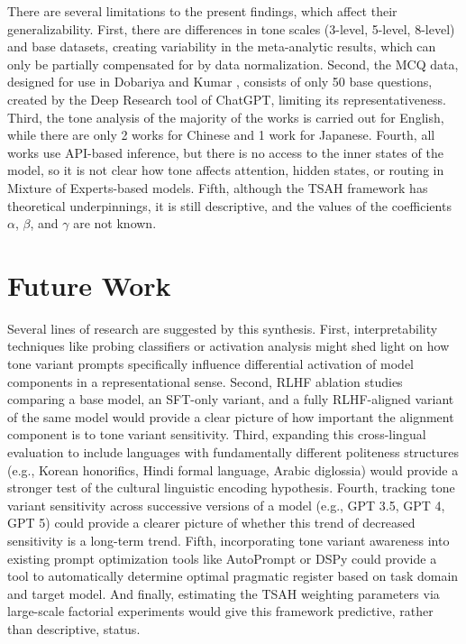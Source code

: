 \documentclass[conference]{IEEEtran}
\begin{document}
There are several limitations to the present findings, which affect their generalizability. First, there are differences in tone scales (3-level, 5-level, 8-level) and base datasets, creating variability in the meta-analytic results, which can only be partially compensated for by data normalization. Second, the MCQ data, designed for use in Dobariya and Kumar \cite{b7}, consists of only 50 base questions, created by the Deep Research tool of ChatGPT, limiting its representativeness. Third, the tone analysis of the majority of the works is carried out for English, while there are only 2 works for Chinese and 1 work for Japanese. Fourth, all works use API-based inference, but there is no access to the inner states of the model, so it is not clear how tone affects attention, hidden states, or routing in Mixture of Experts-based models. Fifth, although the TSAH framework has theoretical underpinnings, it is still descriptive, and the values of the coefficients $\alpha$, $\beta$, and $\gamma$ are not known.

\section{Future Work}

Several lines of research are suggested by this synthesis. First, interpretability techniques like probing classifiers or activation analysis might shed light on how tone variant prompts specifically influence differential activation of model components in a representational sense. Second, RLHF ablation studies comparing a base model, an SFT-only variant, and a fully RLHF-aligned variant of the same model would provide a clear picture of how important the alignment component is to tone variant sensitivity. Third, expanding this cross-lingual evaluation to include languages with fundamentally different politeness structures (e.g., Korean honorifics, Hindi formal language, Arabic diglossia) would provide a stronger test of the cultural linguistic encoding hypothesis. Fourth, tracking tone variant sensitivity across successive versions of a model (e.g., GPT 3.5, GPT 4, GPT 5) could provide a clearer picture of whether this trend of decreased sensitivity is a long-term trend. Fifth, incorporating tone variant awareness into existing prompt optimization tools like AutoPrompt or DSPy could provide a tool to automatically determine optimal pragmatic register based on task domain and target model. And finally, estimating the TSAH weighting parameters via large-scale factorial experiments would give this framework predictive, rather than descriptive, status.
\end{document}
